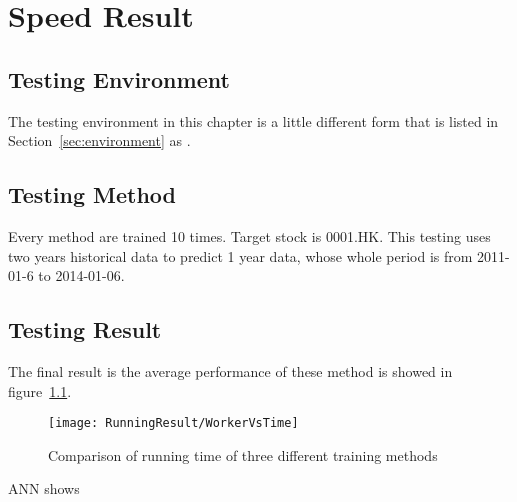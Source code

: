 \chapter{Speed Result}
\label{ch:speedResult}


\section{Testing Environment}
The testing environment in this chapter is a little different form that is listed in Section~\ref{sec:environment} as . \\


\section{Testing Method}
Every method are trained 10 times. Target stock is 0001.HK. This testing uses two years historical data to predict 1 year data, whose whole period is from 2011-01-6 to 2014-01-06. 

\section{Testing Result}
The final result is the average performance of these method is showed in figure~\ref{fg:running_time}.

\begin{figure}[h]
	\centering
	\texttt{[image: RunningResult/WorkerVsTime]}
	\caption{Comparison of running time of three different training methods}
	\label{fg:running_time}
\end{figure}

ANN shows 
